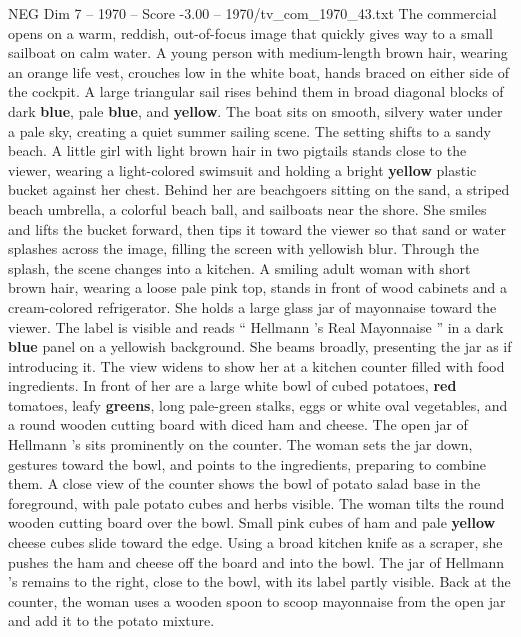 \begin{textsample}{NEG Dim 7 – 1970 – Score -3.00 – 1970/tv\_com\_1970\_43.txt}  \label{ex:f7_neg_066}
The commercial opens on a warm, reddish, out-of-focus image that quickly gives way to a small sailboat on calm water.
A young person with medium-length brown hair, wearing an orange life vest, crouches low in the white boat, hands braced on either side of the cockpit.
A large triangular sail rises behind them in broad diagonal blocks of dark \textbf{blue}, pale \textbf{blue}, and \textbf{yellow}.
The boat sits on smooth, silvery water under a pale sky, creating a quiet summer sailing scene.
The setting shifts to a sandy beach.
A little girl with light brown hair in two pigtails stands close to the viewer, wearing a light-colored swimsuit and holding a bright \textbf{yellow} plastic bucket against her chest.
Behind her are beachgoers sitting on the sand, a striped beach umbrella, a colorful beach ball, and sailboats near the shore.
She smiles and lifts the bucket forward, then tips it toward the viewer so that sand or water splashes across the image, filling the screen with yellowish blur.
Through the splash, the scene changes into a kitchen.
A smiling adult woman with short brown hair, wearing a loose pale pink top, stands in front of wood cabinets and a cream-colored refrigerator.
She holds a large glass jar of mayonnaise toward the viewer.
The label is visible and reads “ Hellmann ’s Real Mayonnaise ” in a dark \textbf{blue} panel on a yellowish background.
She beams broadly, presenting the jar as if introducing it.
The view widens to show her at a kitchen counter filled with food ingredients.
In front of her are a large white bowl of cubed potatoes, \textbf{red} tomatoes, leafy \textbf{greens}, long pale-green stalks, eggs or white oval vegetables, and a round wooden cutting board with diced ham and cheese.
The open jar of Hellmann ’s sits prominently on the counter.
The woman sets the jar down, gestures toward the bowl, and points to the ingredients, preparing to combine them.
A close view of the counter shows the bowl of potato salad base in the foreground, with pale potato cubes and herbs visible.
The woman tilts the round wooden cutting board over the bowl.
Small pink cubes of ham and pale \textbf{yellow} cheese cubes slide toward the edge.
Using a broad kitchen knife as a scraper, she pushes the ham and cheese off the board and into the bowl.
The jar of Hellmann ’s remains to the right, close to the bowl, with its label partly visible.
Back at the counter, the woman uses a wooden spoon to scoop mayonnaise from the open jar and add it to the potato mixture.

\end{textsample}
